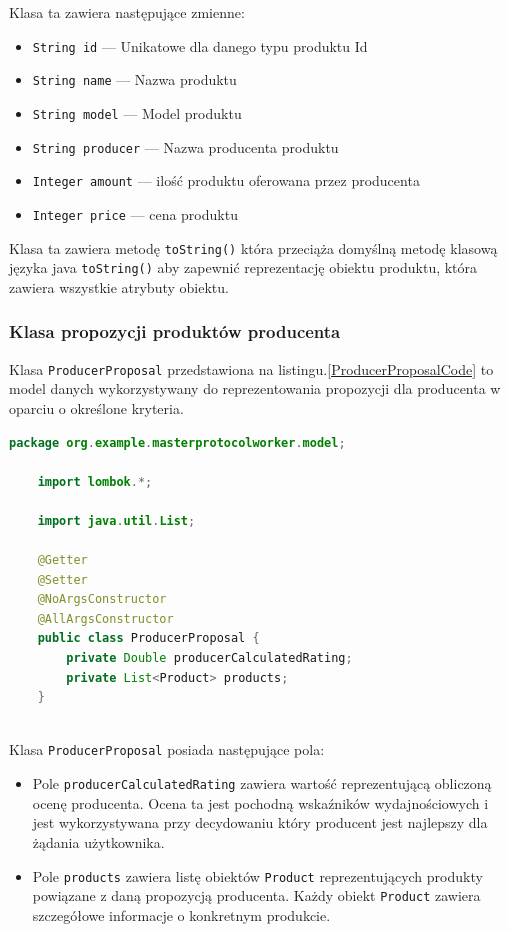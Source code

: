 Klasa ta zawiera następujące zmienne:
\begin{itemize}
    \item \verb|String id| --- Unikatowe dla danego typu produktu Id
    \item \verb|String name| --- Nazwa produktu
    \item \verb|String model| --- Model produktu
    \item \verb|String producer| --- Nazwa producenta produktu
    \item \verb|Integer amount| --- ilość produktu oferowana przez producenta
    \item \verb|Integer price| --- cena produktu
\end{itemize}

Klasa ta zawiera metodę \verb|toString()| która przeciąża domyślną metodę klasową języka java \verb|toString()| aby zapewnić reprezentację obiektu produktu, która zawiera wszystkie atrybuty obiektu.


\subsubsection{Klasa propozycji produktów producenta}

Klasa \verb|ProducerProposal| przedstawiona na listingu.\ref{ProducerProposalCode} to model danych wykorzystywany do reprezentowania propozycji dla producenta w oparciu o określone kryteria.

\begin{lstlisting}[language=Java, caption=Kod klasy ProducerProposal,label=ProducerProposalCode]
    package org.example.masterprotocolworker.model;

    import lombok.*;
    
    import java.util.List;
    
    @Getter
    @Setter
    @NoArgsConstructor
    @AllArgsConstructor
    public class ProducerProposal {
        private Double producerCalculatedRating;
        private List<Product> products;
    }
    
\end{lstlisting}

Klasa \verb|ProducerProposal| posiada następujące pola:
\begin{itemize}
    \item Pole \verb|producerCalculatedRating| zawiera wartość reprezentującą obliczoną ocenę producenta. Ocena ta jest pochodną wskaźników wydajnościowych i jest wykorzystywana przy decydowaniu który producent jest najlepszy dla żądania użytkownika.
    \item Pole \verb|products| zawiera listę obiektów \verb|Product| reprezentujących produkty powiązane z daną propozycją producenta. Każdy obiekt \verb|Product| zawiera szczegółowe informacje o konkretnym produkcie.
\end{itemize}

